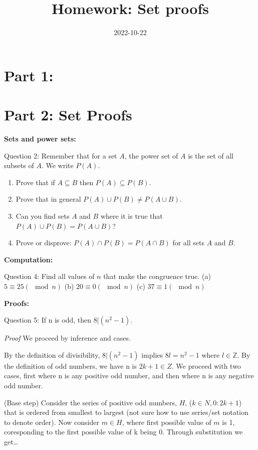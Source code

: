 \documentclass[
]{article}
\title{Homework: Set proofs}
\author{}
\date{\vspace{-2.5em}2022-10-22}
\providecommand{\tightlist}{%
  \setlength{\itemsep}{0pt}\setlength{\parskip}{0pt}}
\begin{document}
\maketitle

\hypertarget{part-1}{%
\section{Part 1:}\label{part-1}}

\hypertarget{part-2-set-proofs}{%
\section{Part 2: Set Proofs}\label{part-2-set-proofs}}

\textbf{Sets and power sets:}

Question 2: Remember that for a set \(A\), the power set of \(A\) is the
set of all subsets of \(A\). We write \(P(A)\).

\begin{enumerate}
\def\labelenumi{(\alph{enumi})}
\tightlist
\item
  Prove that if \(A \subseteq B\) then \(P(A) \subseteq P(B)\).
\item
  Prove that in general \(P(A) \cup P(B) \neq P(A \cup B)\).
\item
  Can you find sets \(A\) and \(B\) where it is true that
  \(P(A) \cup P(B) = P(A\cup B)\)?
\item
  Prove or disprove: \(P(A) \cap P(B) = P(A \cap B)\) for all sets \(A\)
  and \(B\).
\end{enumerate}

\textbf{Computation:}

Question 4: Find all values of \(n\) that make the congruence true. (a)
\(5 \equiv 25 (\mod n)\) (b) \(20 \equiv 0 (\mod n)\) (c)
\(37 \equiv 1 (\mod n)\)

\textbf{Proofs:}

Question 5: If n is odd, then \(8|(n^2-1)\).

\emph{Proof} We proceed by inference and cases.

By the definition of divisibility, \(8|(n^2-1)\) implies \(8l = n^2-1\)
where \(l \in \mathbb{Z}\). By the definition of odd numbers, we have n
is \(2k +1 \in Z\). We proceed with two cases, first where n is any
positive odd number, and then where n is any negative odd number.

(Base step) Consider the series of positive odd numbers, \(H\),
(\(k \in N ,0:2k+1\)) that is ordered from smallest to largest (not sure
how to use series/set notation to denote order). Now consider
\(m \in H\), where first possible value of \(m\) is 1, coresponding to
the first possible value of k being 0. Through substitution we
get\ldots{}
\end{document}
